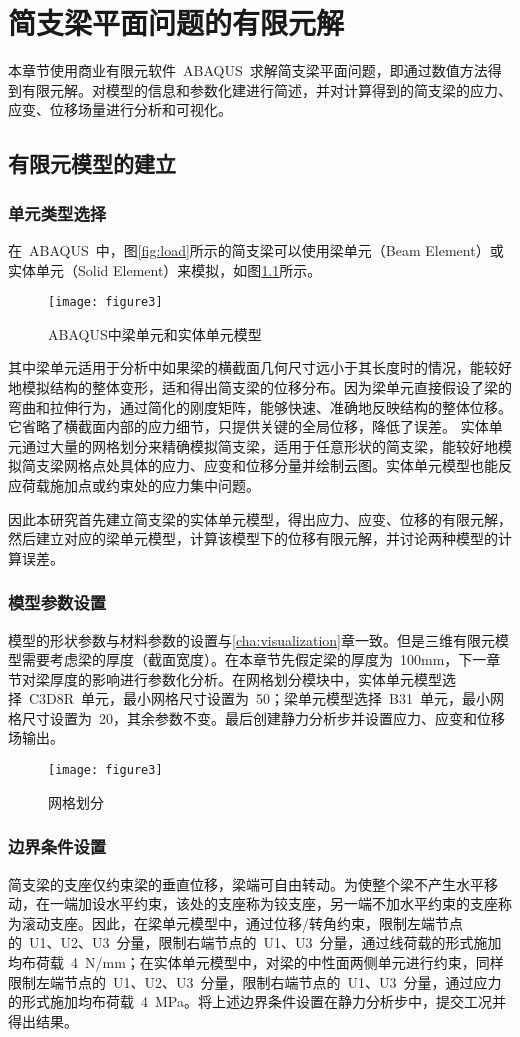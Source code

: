 \chapter{简支梁平面问题的有限元解}
\label{cha:FEAsolution}
本章节使用商业有限元软件~ABAQUS~求解简支梁平面问题，即通过数值方法得到有限元解。对模型的信息和参数化建进行简述，并对计算得到的简支梁的应力、应变、位移场量进行分析和可视化。
\section{有限元模型的建立}
\subsection{单元类型选择}
在~ABAQUS~中，图\ref{fig:load}所示的简支梁可以使用梁单元（Beam Element）或实体单元（Solid Element）来模拟，如图\ref{fig:models}所示。
\begin{figure}[htbp]
    \centering
	\texttt{[image: figure3]}
    \caption{ABAQUS中梁单元和实体单元模型}
    \label{fig:models}
\end{figure}
其中梁单元适用于分析中如果梁的横截面几何尺寸远小于其长度时的情况，能较好地模拟结构的整体变形，适和得出简支梁的位移分布。因为梁单元直接假设了梁的弯曲和拉伸行为，通过简化的刚度矩阵，能够快速、准确地反映结构的整体位移。它省略了横截面内部的应力细节，只提供关键的全局位移，降低了误差。
实体单元通过大量的网格划分来精确模拟简支梁，适用于任意形状的简支梁，能较好地模拟简支梁网格点处具体的应力、应变和位移分量并绘制云图。实体单元模型也能反应荷载施加点或约束处的应力集中问题。

因此本研究首先建立简支梁的实体单元模型，得出应力、应变、位移的有限元解，然后建立对应的梁单元模型，计算该模型下的位移有限元解，并讨论两种模型的计算误差。
\subsection{模型参数设置}
模型的形状参数与材料参数的设置与\ref{cha:visualization}章一致。但是三维有限元模型需要考虑梁的厚度（截面宽度）。在本章节先假定梁的厚度为~100mm，下一章节对梁厚度的影响进行参数化分析。在网格划分模块中，实体单元模型选择~C3D8R~单元，最小网格尺寸设置为~50；梁单元模型选择~B31~单元，最小网格尺寸设置为~20，其余参数不变。最后创建静力分析步并设置应力、应变和位移场输出。
\begin{figure}[htbp]
    \centering
	\texttt{[image: figure3]}
    \caption{网格划分}
    \label{fig:mesh}
\end{figure}
\subsection{边界条件设置}
简支梁的支座仅约束梁的垂直位移，梁端可自由转动。为使整个梁不产生水平移动，在一端加设水平约束，该处的支座称为铰支座，另一端不加水平约束的支座称为滚动支座。因此，在梁单元模型中，通过位移/转角约束，限制左端节点的~U1、U2、U3~分量，限制右端节点的~U1、U3~分量，通过线荷载的形式施加均布荷载~4~N/mm；在实体单元模型中，对梁的中性面两侧单元进行约束，同样限制左端节点的~U1、U2、U3~分量，限制右端节点的~U1、U3~分量，通过应力的形式施加均布荷载~4~MPa。将上述边界条件设置在静力分析步中，提交工况并得出结果。
